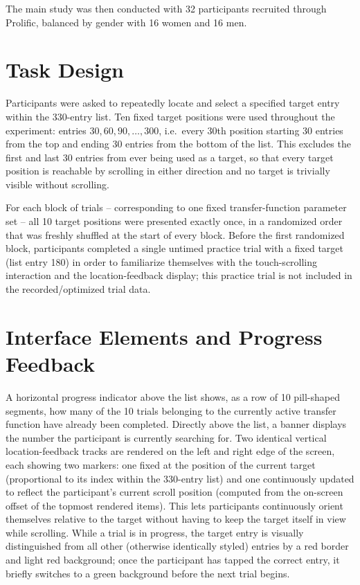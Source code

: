 \documentclass[12pt,a4paper]{report}
\begin{document}
        The main study was then conducted with 32 participants recruited through Prolific, balanced by gender with 16 women and 16 men.

        \section{Task Design}
        \label{sec:task}

        Participants were asked to repeatedly locate and select a specified target entry within the 330-entry list. Ten fixed target positions were used throughout the experiment: entries $30, 60, 90, \dots, 300$, i.e.\ every 30th position starting 30 entries from the top and ending 30 entries from the bottom of the list. This excludes the first and last 30 entries from ever being used as a target, so that every target position is reachable by scrolling in either direction and no target is trivially visible without scrolling.

        For each block of trials -- corresponding to one fixed transfer-function parameter set -- all 10 target positions were presented exactly once, in a randomized order that was freshly shuffled at the start of every block. Before the first randomized block, participants completed a single untimed practice trial with a fixed target (list entry 180) in order to familiarize themselves with the touch-scrolling interaction and the location-feedback display; this practice trial is not included in the recorded/optimized trial data.

        \section{Interface Elements and Progress Feedback}
        \label{sec:interface}

        A horizontal progress indicator above the list shows, as a row of 10 pill-shaped segments, how many of the 10 trials belonging to the currently active transfer function have already been completed. Directly above the list, a banner displays the number the participant is currently searching for. Two identical vertical location-feedback tracks are rendered on the left and right edge of the screen, each showing two markers: one fixed at the position of the current target (proportional to its index within the 330-entry list) and one continuously updated to reflect the participant's current scroll position (computed from the on-screen offset of the topmost rendered items). This lets participants continuously orient themselves relative to the target without having to keep the target itself in view while scrolling. While a trial is in progress, the target entry is visually distinguished from all other (otherwise identically styled) entries by a red border and light red background; once the participant has tapped the correct entry, it briefly switches to a green background before the next trial begins.
\end{document}
